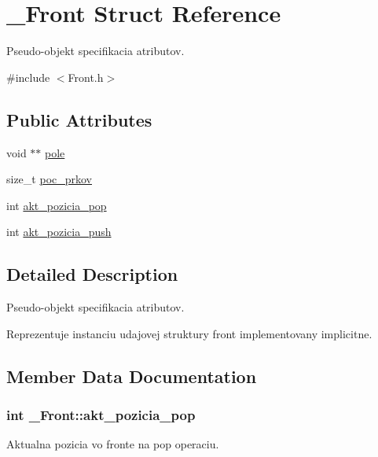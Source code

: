 \hypertarget{struct__Front}{}\section{\+\_\+\+Front Struct Reference}
\label{struct__Front}


Pseudo-\/objekt specifikacia atributov.  




{\ttfamily \#include $<$Front.\+h$>$}

\subsection*{Public Attributes}
\begin{DoxyCompactItemize}
\item 
void $\ast$$\ast$ \hyperlink{struct__Front_aaeb70caeedb19e72ba106f621e496942}{pole}
\item 
size\+\_\+t \hyperlink{struct__Front_a4eadefd147ef83ec0a5f855046ad192a}{poc\+\_\+prkov}
\item 
int \hyperlink{struct__Front_ab755728649fe43c6e3c394ed168387d7}{akt\+\_\+pozicia\+\_\+pop}
\item 
int \hyperlink{struct__Front_a0931c8786584f8671ec4b7c42ba2bdee}{akt\+\_\+pozicia\+\_\+push}
\end{DoxyCompactItemize}


\subsection{Detailed Description}
Pseudo-\/objekt specifikacia atributov. 

Reprezentuje instanciu udajovej struktury front implementovany implicitne. 

\subsection{Member Data Documentation}
\subsubsection[{\texorpdfstring{akt\+\_\+pozicia\+\_\+pop}{akt_pozicia_pop}}]{\setlength{\rightskip}{0pt plus 5cm}int \+\_\+\+Front\+::akt\+\_\+pozicia\+\_\+pop}\hypertarget{struct__Front_ab755728649fe43c6e3c394ed168387d7}{}\label{struct__Front_ab755728649fe43c6e3c394ed168387d7}
Aktualna pozicia vo fronte na pop operaciu. 
